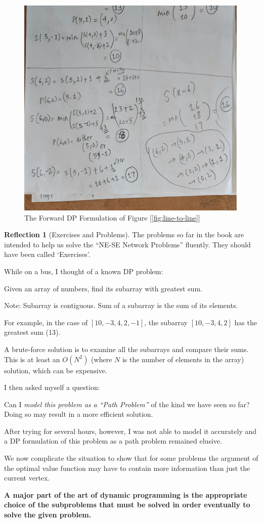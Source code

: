 \documentclass[english,notitlepage,smartquotes]{hgbreport}
\theoremstyle{definition}
\theoremstyle{definition}
\theoremstyle{remark}
\theoremstyle{definition}
\theoremstyle{plain}
\theoremstyle{definition}
\newtheorem{reflection}{Reflection}
\begin{document}
\begin{figure}[H]
\centering
\includegraphics[width=.5\textwidth,angle=-90]{forward-dp-p1.6}
\caption{The Forward DP Formulation of Figure [\ref{fig:line-to-line}]}
\label{fig:forwarddpsol2}
\end{figure}

\begin{reflection}[Exercises and Problems]
The problems so far in the book are intended to help us solve the ``NE-SE Network Problems'' fluently. They should have been called `Exercises'. 

While on a bus, I thought of a known DP problem:
\begin{sidebar}
Given an array of numbers, find its subarray with greatest sum.

Note: Subarray is contiguous. Sum of a subarray is the sum of its elements.

For example, in the case of $[10,-3,4,2,-1]$, the subarray $[10,-3,4,2]$ has the greatest sum (13). 
\end{sidebar}

A brute-force solution is to examine all the subarrays and compare their sums. This is at least an $O(N^2)$ (where $N$ is the number of elements in the array) solution, which can be expensive.

I then asked myself a question:
\begin{sidebar}
Can I \emph{model this problem as a ``Path Problem''} of the kind we have seen so far? Doing so may result in a more efficient solution.
\end{sidebar}


After trying for several hours, however, I was not able to model it accurately and a DP formulation of this problem as a path problem remained elusive.

\end{reflection}

We now complicate the situation to show that for some problems the argument of the optimal value function may have to contain more information than just the current vertex. 

\textbf{
A major part of the art of dynamic programming is the appropriate choice of the subproblems that must be solved in order eventually to solve the given problem.} 

\MakeBibliography[nosplit]

\end{document}
